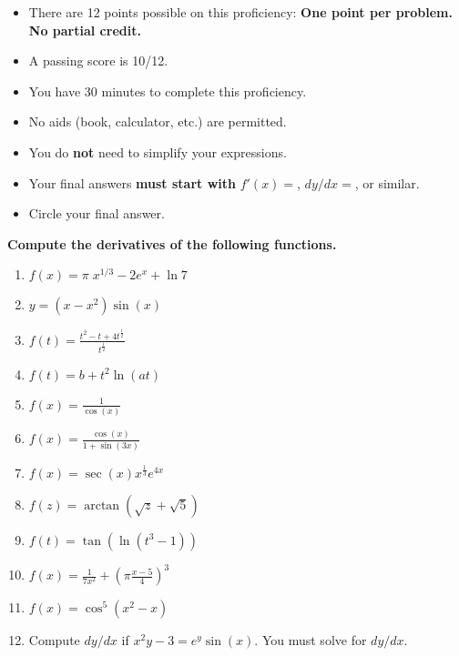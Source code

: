 \documentclass[12pt]{article}
\newcommand{\ds}{\displaystyle}
\begin{document}
\begin{itemize}
\addtolength\itemsep{-1mm}
\item There are 12 points possible on this proficiency: \textbf{One point per problem. No partial credit.}

\item A passing score is 10/12.

\item You have 30 minutes to complete this proficiency.

\item No aids (book, calculator, etc.) are permitted.  

\item You do \textbf{not} need to simplify your expressions.

\item Your final answers \textbf{must start with} $f'(x)=$, $dy/dx=$, or similar.

\item Circle your final answer.
\end{itemize}

\noindent \textbf{Compute the derivatives of the following functions.}

\begin{enumerate}
\item $\ds f(x) = \pi\; x^{1/3} - 2 e^x + \ln 7$
\vfill
\item $\ds y = (x-x^2)\sin(x)$
\vfill
\item $\ds f(t) = \frac{t^2-t+4t^\frac{1}{2}}{t^\frac{1}{2}}$
\vfill
\newpage
\item $\ds f(t) = b + t^2\ln(at)$
\vfill
\item $\ds f(x) = \frac{1}{\cos(x)}$
\vfill
\item $\ds f(x) = \frac{\cos(x)}{1+\sin(3x)}$
\vfill
\newpage
\item $\ds f(x)=\sec(x)x^{\frac{1}{3}}e^{4x}$
\vfill
\item $ \ds f(z) =  \arctan(\sqrt{z} + \sqrt{5})$
\vfill
\item $\ds f(t) =  \tan(\ln(t^3-1))$
\vfill
\newpage
\item $\ds f(x) = \frac{1}{7x^2} + \left(\pi\frac{x-5}{4}\right)^3$
\vfill
\item $\ds f(x) = \ds \cos^5(x^2-x)$
\vfill
\item Compute $dy/dx$ if \quad $\ds x^2y-3=e^y\sin(x)$. \quad You must solve for $dy/dx$.
\vfill
\end{enumerate}
\end{document}
